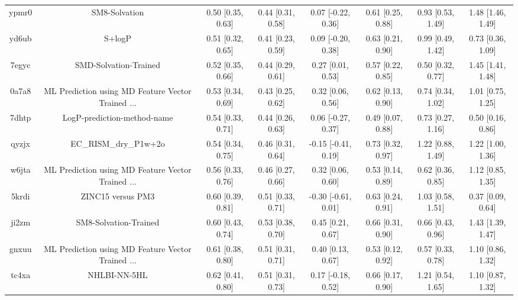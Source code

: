 \documentclass{article}
\begin{document}
\begin{center}
\begin{longtable}{|cccccccc|}
 ypmr0 &                                      SM8-Solvation &  0.50 [0.35, 0.63] &  0.44 [0.31, 0.58] &    0.07 [-0.22, 0.36] &  0.61 [0.25, 0.88] &    0.93 [0.53, 1.49] &     1.48 [1.46, 1.49] \\
 yd6ub &                                             S+logP &  0.51 [0.32, 0.65] &  0.41 [0.23, 0.59] &    0.09 [-0.20, 0.38] &  0.63 [0.21, 0.90] &    0.99 [0.49, 1.42] &     0.73 [0.36, 1.09] \\
 7egyc &                              SMD-Solvation-Trained &  0.52 [0.35, 0.66] &  0.44 [0.29, 0.61] &     0.27 [0.01, 0.53] &  0.57 [0.22, 0.85] &    0.50 [0.32, 0.77] &     1.45 [1.41, 1.48] \\
 0a7a8 &  ML Prediction using MD Feature Vector Trained ... &  0.53 [0.34, 0.69] &  0.43 [0.25, 0.62] &     0.32 [0.06, 0.56] &  0.62 [0.13, 0.90] &    0.74 [0.34, 1.02] &     1.01 [0.75, 1.25] \\
 7dhtp &                        LogP-prediction-method-name &  0.54 [0.33, 0.71] &  0.44 [0.26, 0.63] &    0.06 [-0.27, 0.37] &  0.49 [0.07, 0.88] &    0.73 [0.27, 1.16] &     0.50 [0.16, 0.86] \\
 qyzjx &                              EC\_RISM\_dry\_P1w+2o &  0.54 [0.34, 0.75] &  0.46 [0.31, 0.64] &   -0.15 [-0.41, 0.19] &  0.73 [0.32, 0.97] &    1.22 [0.88, 1.49] &     1.22 [1.00, 1.36] \\
 w6jta &  ML Prediction using MD Feature Vector Trained ... &  0.56 [0.33, 0.76] &  0.46 [0.27, 0.66] &     0.32 [0.06, 0.60] &  0.53 [0.14, 0.89] &    0.62 [0.36, 0.85] &     1.12 [0.85, 1.35] \\
 5krdi &                                  ZINC15 versus PM3 &  0.60 [0.39, 0.81] &  0.51 [0.33, 0.71] &   -0.30 [-0.61, 0.01] &  0.63 [0.24, 0.91] &    1.03 [0.58, 1.51] &     0.37 [0.09, 0.64] \\
 ji2zm &                              SM8-Solvation-Trained &  0.60 [0.43, 0.74] &  0.53 [0.38, 0.70] &     0.45 [0.21, 0.67] &  0.66 [0.31, 0.90] &    0.66 [0.43, 0.96] &     1.43 [1.39, 1.47] \\
 gnxuu &  ML Prediction using MD Feature Vector Trained ... &  0.61 [0.38, 0.80] &  0.51 [0.31, 0.71] &     0.40 [0.13, 0.67] &  0.53 [0.12, 0.92] &    0.57 [0.33, 0.78] &     1.10 [0.86, 1.32] \\
 tc4xa &                                       NHLBI-NN-5HL &  0.62 [0.41, 0.80] &  0.51 [0.31, 0.73] &    0.17 [-0.18, 0.52] &  0.66 [0.17, 0.90] &    1.21 [0.54, 1.65] &     1.10 [0.87, 1.32] \\

\end{longtable}
\end{center}
\end{document}
